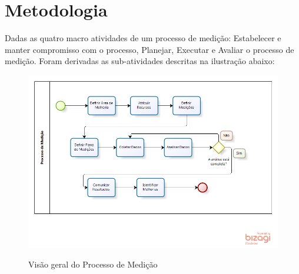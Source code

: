 \chapter{Metodologia}
Dadas as quatro macro atividades de um processo de medição: Estabelecer e manter compromisso com o processo, Planejar, Executar e Avaliar o processo de medição. Foram derivadas as sub-atividades descritas na ilustração abaixo:
\begin{figure}[!htp]
		\centering
		\includegraphics[scale=0.75]{figuras/medicao}
		\label{img:processo}
		\caption{Visão geral do Processo de Medição}
\end{figure}
